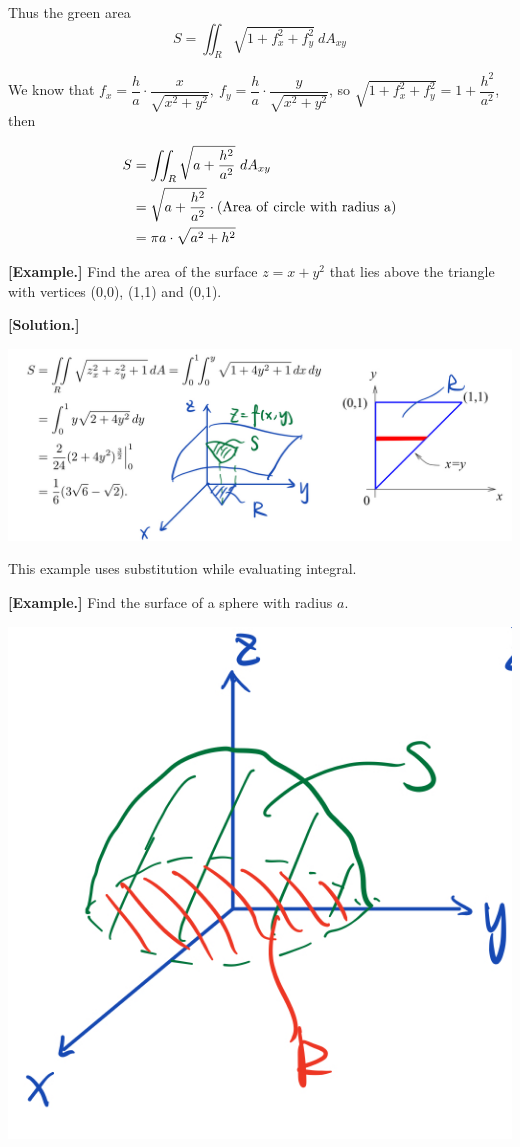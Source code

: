 \documentclass[11pt, a4paper]{MATH2023}
\newcommand{\eg}{\textbf{[Example.] }}
\newcommand{\sol}{\textbf{[Solution.] }}
\begin{document}
\begin{spacing}{1.3}
    Thus the green area $$S=\iint_R\sqrt{1+f_x^2+f_y^2}\ dA_{xy}$$

    We know that $f_x=\dfrac{h}{a}\cdot \dfrac{x}{\sqrt{x^2+y^2}},\ f_y=\dfrac{h}{a}\cdot \dfrac{y}{\sqrt{x^2+y^2}}$, so 
    $\sqrt{1+f_x^2+f_y^2}=1+\dfrac{h^2}{a^2}$, then

    \begin{align*}
        S &= \iint_R \sqrt{a+\frac{h^2}{a^2}}\ dA_{xy}\\ 
          &= \sqrt{a+\frac{h^2}{a^2}} \cdot {\rm (Area\ of\ circle\ with\ radius\ a)}\\
          &= \pi a\cdot \sqrt{a^2+h^2}
    \end{align*}

    \vspace{0.5in}
    \eg Find the area of the surface $z=x+y^2$ that lies above the triangle with vertices (0,0), (1,1)
    and (0,1).

    \sol 
    \begin{center}
        \includegraphics[scale=0.3]{images/Ch14-surface-area-eg3.jpeg}
    \end{center}


    \newpage
    {\blue This example uses substitution while evaluating integral.}

    \eg Find the surface of a sphere with radius $a$.
    \begin{center}
        \includegraphics[scale=0.25]{images/Ch14-surface-area-eg4.jpeg}
    \end{center}


\end{spacing}
\end{document}
